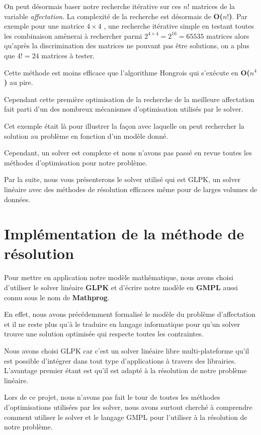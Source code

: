 \documentclass[final,poster]{polytech/polytech}
\begin{document}
On peut désormais baser notre recherche itérative sur ces $n!$ matrices de la variable \textit{affectation}. La complexité de la recherche est désormais de  \textbf{O($n!$)}. Par exemple pour une matrice $4\times 4$ , une recherche itérative simple en testant toutes les combinaison amènerai à rechercher parmi $2^{4\times 4} = 2^{16}=65535$ matrices alors qu'après la discrimination des matrices ne pouvant pas être solutions, on a plus que $4!=24$ matrices à tester. 

Cette méthode est moins efficace que l'algorithme Hongrois qui s'exécute en \textbf{O($n^4$)} au pire.

Cependant cette première optimisation de la recherche de la meilleure affectation fait parti d'un des nombreux mécanismes d'optimisation utilisés par le solver.

Cet exemple était là pour illustrer la façon avec laquelle on peut rechercher la solution au problème en fonction d'un modèle donné.

Cependant, un solver est complexe et nous n'avons pas passé en revue toutes les méthodes d'optimisation pour notre problème.

Par la suite, nous vous présenterons le solver utilisé qui est GLPK, un solver linéaire avec des méthodes de résolution efficaces même pour de larges volumes de données.

\section{Implémentation de la méthode de résolution}

Pour mettre en application notre modèle mathématique, nous avons choisi d'utiliser le solver linéaire \textbf{GLPK} et d'écrire notre modèle en \textbf{GMPL} aussi connu sous le nom de \textbf{Mathprog}.

En effet, nous avons précédemment formalisé le modèle du problème d'affectation et il ne reste plus qu'à le traduire en langage informatique pour qu'un solver trouve une solution optimisée qui respecte toutes les contraintes.

Nous avons choisi GLPK car c'est un solver linéaire libre multi-plateforme qu'il est possible d'intégrer dans tout type d'applications à travers des librairies. L'avantage premier étant est qu'il est adapté à la résolution de notre problème linéaire.

Lors de ce projet, nous n'avons pas fait le tour de toutes les méthodes d'optimisations utilisées par les solver, nous avons surtout cherché à comprendre comment utiliser le solver et le langage GMPL pour l'utiliser à la résolution de notre problème.
 
\end{document}
